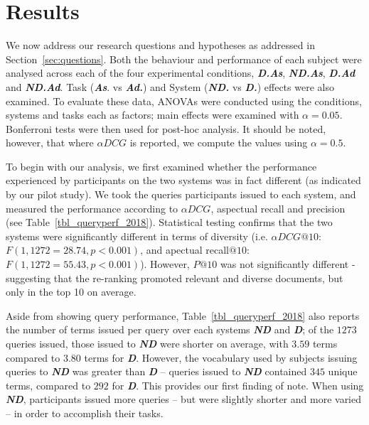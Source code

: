 \section{Results} \label{sec:results}

We now address our research questions and hypotheses as addressed in Section~\ref{sec:questions}. Both the behaviour and performance of each subject were analysed across each of the four experimental conditions, \textbf{\emph{D.As}}, \textbf{\emph{ND.As}}, \textbf{\emph{D.Ad}} and \textbf{\emph{ND.Ad}}. Task (\emph{\textbf{As}}. vs \emph{\textbf{Ad.}}) and System (\emph{\textbf{ND.}} vs \emph{\textbf{D.}}) effects were also examined. To evaluate these data, ANOVAs were conducted using the conditions, systems and tasks each as factors; main effects were examined with $\alpha=0.05$. Bonferroni tests were then used for post-hoc analysis. It should be noted, however, that where $\alpha DCG$ is reported, we compute the values using $\alpha=0.5$.

To begin with our analysis, we first examined whether the performance experienced by participants on the two systems was in fact different (as indicated by our pilot study). We took the queries participants issued to each system, and measured the performance according to $\alpha DCG$, aspectual recall and precision (see Table~\ref{tbl_queryperf_2018}). Statistical testing confirms that the two systems were significantly different 
 in terms of diversity (i.e. $\alpha DCG@10$: $F(1, 1272=28.74, p<0.001)$, and apectual recall$@10$: $F(1, 1272=55.43, p<0.001)$). However, $P@10$ was not significantly different - suggesting that the re-ranking promoted relevant and diverse documents, but only in the top 10 on average.
 
 Aside from showing query performance, Table~\ref{tbl_queryperf_2018} also reports the number of terms issued per query over each systems \textbf{\emph{ND}} and \textbf{\emph{D}}; of the $1273$ queries issued, those issued to \textbf{\emph{ND}} were shorter on average, with $3.59$ terms compared to $3.80$ terms for \textbf{\emph{D}}. However, the vocabulary used by subjects issuing queries to \textbf{\emph{ND}} was greater than \textbf{\emph{D}} -- queries issued to \textbf{\emph{ND}} contained $345$ unique terms, compared to $292$ for \textbf{\emph{D}}.
This provides our first finding of note. When using \textbf{\emph{ND}}, participants issued more queries -- but were slightly shorter and more varied -- in order to accomplish their tasks. 


